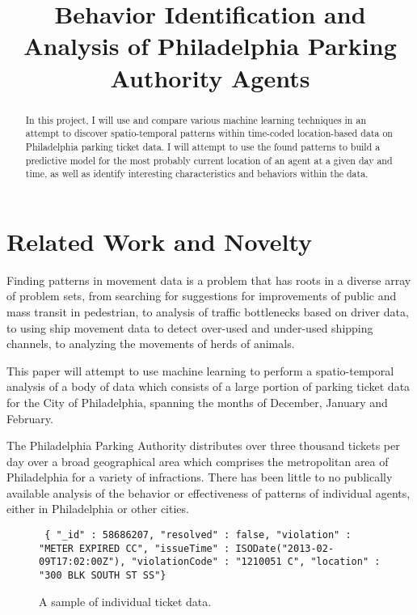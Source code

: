 \documentclass[conference]{IEEEtran}
\begin{document}
\title{Behavior Identification and Analysis of Philadelphia Parking Authority Agents}

\author{
}

\maketitle

\begin{abstract}
In this project, I will use and compare various machine learning techniques in
an attempt to discover spatio-temporal patterns within time-coded location-based
data on Philadelphia parking ticket data. I will attempt to use the found
patterns to build a predictive model for the most probably current location of
an agent at a given day and time, as well as identify interesting
characteristics and behaviors within the data.

\end{abstract}

\section{Related Work and Novelty}
\label{sec:intro}
Finding patterns in movement data is a problem that has roots in a diverse array
of problem sets, from searching for suggestions for improvements of public and
mass transit in pedestrian, to analysis of traffic bottlenecks based on driver
data, to using ship movement data to detect over-used and under-used shipping
channels, to analyzing the movements of herds of animals.

This paper will attempt to use machine learning to perform a spatio-temporal
analysis of a body of data which consists of a large portion of parking ticket
data for the City of Philadelphia, spanning the months of December, January and
February.

The Philadelphia Parking Authority distributes over three thousand tickets per
day over a broad geographical area which comprises the metropolitan area of
Philadelphia for a variety of infractions. There has been little to no
publically available analysis of the behavior or effectiveness of patterns of
individual agents, either in Philadelphia or other cities.


\begin{figure}[h]
\small{\texttt{
    \{ "\_id" : 58686207, "resolved" : false, "violation" : "METER EXPIRED CC",
    "issueTime" : ISODate("2013-02-09T17:02:00Z"), "violationCode" : "1210051
    C", "location" : "300 BLK SOUTH ST SS"\}}
\caption{A sample of individual ticket data.}}
\end{figure}
\end{document}
